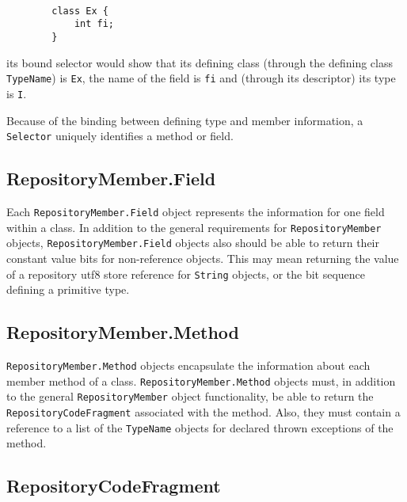 \documentclass{report}
\begin{document}
\begin{verbatim}

        class Ex {
            int fi;
        }

\end{verbatim}

\noindent its bound selector would show that its defining class (through
the defining class \texttt{TypeName}) is \texttt{Ex}, the name of the field
is \texttt{fi} and (through its descriptor) its type is \texttt{I}.

Because of the binding between defining type and member information,
a \texttt{Se\-lec\-tor} uniquely identifies a method or field.

\subsection{RepositoryMember.Field}\label{field}

Each \texttt{RepositoryMember.Field} object represents the information for
one field within a class. In addition to the general requirements for 
\texttt{Re\-pos\-i\-tory\-Mem\-ber} objects, 
\texttt{Re\-pos\-i\-tory\-Mem\-ber.Field} objects also should be able to 
return their constant value bits for non-reference objects. This may mean 
returning the value of a repository utf8 store reference for \texttt{String} 
objects, or the bit sequence defining a primitive type.


\subsection{RepositoryMember.Me\-thod}\label{method}

\texttt{Re\-pos\-i\-tory\-Mem\-ber.Meth\-od} objects encapsulate the 
information about each member method of a class. 
\texttt{Re\-pos\-i\-tory\-Mem\-ber.Meth\-od} objects must, in addition to the 
general \texttt{Re\-pos\-i\-tory\-Mem\-ber} object functionality, be able to 
return the \texttt{RepositoryCodeFragment} associated with the method. Also, 
they must contain a reference to a list of the \texttt{TypeName} objects for 
declared thrown exceptions of the method.

\subsection{RepositoryCodeFragment}\label{codefrag}
\end{document}
